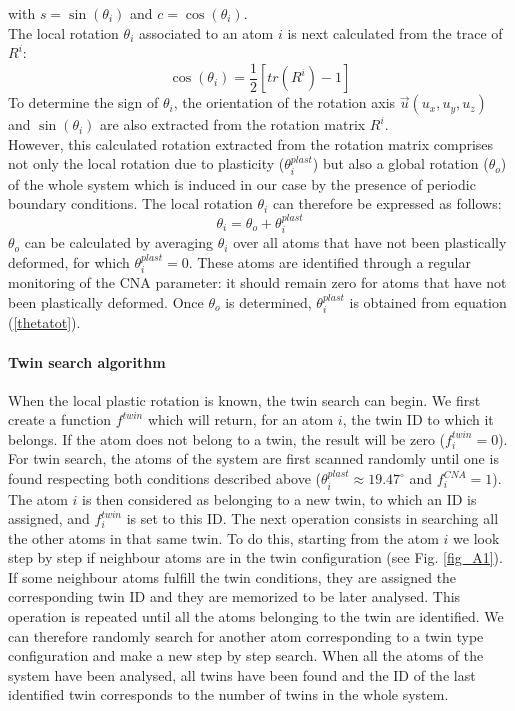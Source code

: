\documentclass[final,3p,times,twocolumn]{elsarticle}
\begin{document}
with $ s=\sin(\theta_{i}) $ and $ c=\cos(\theta_{i}) $. \\
The local rotation $ \theta_{i} $ associated to an atom $ i $ is next calculated from the trace of $ R^{i} $:
\begin{equation}
	\cos(\theta_{i})=\frac{1}{2}\left[tr\left(R^{i}\right)-1\right]
\end{equation}
To determine the sign of $ \theta_{i} $, the orientation of the rotation axis $ \overrightarrow{u}(u_{x},u_{y},u_{z}) $ and $\sin(\theta_{i}) $ are also extracted from the rotation matrix $ R^{i} $.
\\
However, this calculated rotation extracted from the rotation matrix comprises not only the local rotation due to plasticity ($ \theta_{i}^{plast} $) but also a global rotation ($ \theta_{o} $) of the whole system which is induced in our case by the presence of periodic boundary conditions. The local rotation $ \theta_{i} $ can therefore be expressed as follows:
\begin{equation}\label{thetatot}
\theta_{i}=\theta_{o}+\theta_{i}^{plast}
\end{equation}
$ \theta_{o} $ can be calculated by averaging $ \theta_{i} $ over all atoms that have not been plastically deformed, for which $ \theta_{i}^{plast}=0 $. These atoms are identified through a regular monitoring of the CNA parameter: it should remain zero for atoms that have not been plastically deformed. Once $ \theta_{o} $ is determined, $ \theta_{i}^{plast} $ is obtained from equation (\ref{thetatot}).


\paragraph{Twin search algorithm}
When the local plastic rotation is known, the twin search can begin. We first create a function $ f^{twin} $ which will return, for an atom $ i $, the twin ID to which it belongs. If the atom does not belong to a twin, the result will be zero ($ f^{twin}_{i}=0$). For twin search, the atoms of the system are first scanned randomly until one is found respecting both conditions described above ($ \theta_{i}^{plast} \approx 19.47^{\circ} $ and $f^{CNA}_{i}=1 $). The atom $i$ is then considered as belonging to a new twin, to which an ID is assigned, and $f^{twin}_{i}$ is set to this ID. The next operation consists in searching all the other atoms in that same twin. To do this, starting from the atom $ i $ we look step by step if neighbour atoms are in the twin configuration (see Fig. \ref{fig_A1}). If some neighbour atoms fulfill the twin conditions, they are assigned the corresponding twin ID and they are memorized to be later analysed. This operation is repeated until all the atoms belonging to the twin are identified. We can therefore randomly search for another atom corresponding to a twin type configuration and make a new step by step search. When all the atoms of the system have been analysed, all twins have been found and the ID of the last identified twin corresponds to the number of twins in the whole system.
\end{document}
